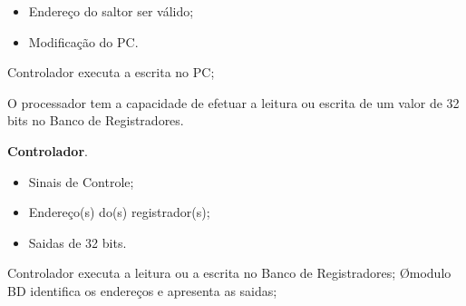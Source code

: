 \documentclass{article}
\begin{document}
  \preconditions 
    \begin{itemize}
     \item Endereço do saltor ser válido;
    \end{itemize}

  \postconditions
    \begin{itemize}
     \item Modificação do PC.
    \end{itemize}

  
  \begin{mainflow}
    \item Controlador executa a escrita no PC;
  \end{mainflow}  

   O processador tem a capacidade de efetuar a leitura ou escrita de um valor de 32 bits no Banco de Registradores.
  
  \actors
    \begin{description}
     \item \textbf{Controlador}.
    \end{description}
    
  \preconditions 
    \begin{itemize}
    \item Sinais de Controle;
    \item Endereço(s) do(s) registrador(s);
    \end{itemize}

  \postconditions
    \begin{itemize}
    \item Saidas de 32 bits.
    \end{itemize}

  
  \begin{mainflow}
    \item Controlador executa a leitura ou a escrita no Banco de Registradores;
    \O modulo BD identifica os endereços e apresenta as saidas;
  \end{mainflow}  


 

% 
% 
\end{document}
